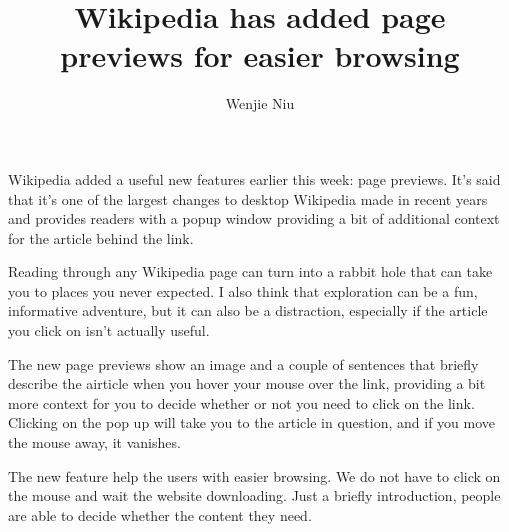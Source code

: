 \documentclass{article}
\author{Wenjie Niu}
\title{Wikipedia has added page previews for easier browsing}
\begin{document}
\maketitle
Wikipedia added a useful new features earlier this week: page previews. It's said that it's one of the largest changes to desktop Wikipedia made in recent years and provides readers with a popup window providing a bit of additional context for the article behind the link.

Reading through any Wikipedia page can turn into a rabbit hole that can take you to places you never expected. I also think that exploration can be a fun, informative adventure, but it can also be a distraction, especially if the article you click on isn't actually useful.

The new page previews show an image and a couple of sentences that briefly describe the airticle when you hover your mouse over the link, providing a bit more context for you to decide whether or not you need to click on the link. Clicking on the pop up will take you to the article in question, and if you move the mouse away, it vanishes.

The new feature help the users with easier browsing. We do not have to click on the mouse and wait the website downloading. Just a briefly introduction, people are able to decide whether the content they need. 
\end{document}
